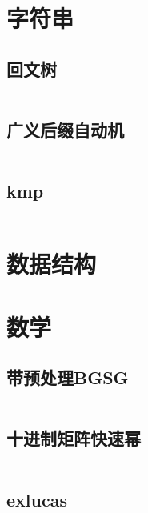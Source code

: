 \documentclass[a4paper,11pt]{article}
\begin{document}






\newpage
\section{字符串}

\subsection{回文树}
\inputminted[breaklines]{c++}{String/pam.cpp}

\subsection{广义后缀自动机}
\inputminted[breaklines]{c++}{String/sam.cpp}

\subsection{kmp}
\inputminted[breaklines]{c++}{String/kmp.cpp}


\newpage
\section{数据结构}











\newpage
\section{数学} %

\subsection{带预处理BGSG}
\inputminted[breaklines]{c++}{Math/BGSG.cpp}

\subsection{十进制矩阵快速幂}
\inputminted[breaklines]{c++}{Math/快速幂.cpp}

\subsection{exlucas}
\inputminted[breaklines]{c++}{Math/exlucas.cpp}
\end{document}
